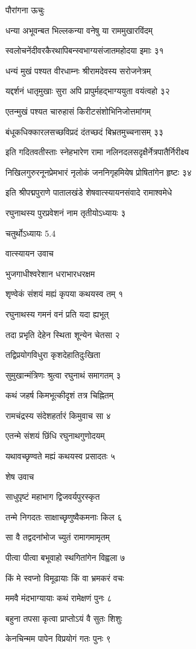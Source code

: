 पौरांगना ऊचुः

धन्या अभूवन्बत भिल्लकन्या वनेषु या राममुखारविंदम्

स्वलोचनेंदीवरकैरथापिबन्स्वभाग्यसंजातमहोदया इमाः ३१

धन्यं मुखं पश्यत वीरधाम्नः श्रीरामदेवस्य सरोजनेत्रम्

यद्दर्शनं धातृमुखाः सुरा अपि प्रापुर्महद्भाग्ययुता वयंत्वहो ३२

एतन्मुखं पश्यत चारुहासं किरीटसंशोभिनिजोत्तमांगम्

बंधूकधिक्कारलसच्छविप्रदं दंतच्छदं बिभ्रतमुच्चनासम् ३३

इति गदितवतीस्ताः स्नेहभारेण रामा नलिनदलसदृक्षैर्नेत्रपातैर्निरीक्ष्य

निखिलगुरुरनूनप्रेमभारं नृलोकं जननिगृहमियेष प्रोषितांगेन हृष्टः ३४

इति श्रीपद्मपुराणे पातालखंडे शेषवात्स्यायनसंवादे रामाश्वमेधे

रघुनाथस्य पुरप्रवेशनं नाम तृतीयोऽध्यायः ३

चतुर्थोऽध्यायः 5.4

वात्स्यायन उवाच

भुजगाधीश्वरेशान धराभारधरक्षम

शृण्वेकं संशयं मह्यं कृपया कथयस्व तम् १

रघुनाथस्य गमनं वनं प्रति यदा ह्यभूत्

तदा प्रभृति देहेन स्थिता शून्येन चेतसा २

तद्विप्रयोगविधुरा कृशदेहातिदुःखिता

सुमुखान्मंत्रिणः श्रुत्वा रघुनाथं समागतम् ३

कथं जहर्ष किमभूत्कीदृशं तत्र चिह्नितम्

रामचंद्रस्य संदेशहर्तारं किमुवाच सा ४

एतन्मे संशयं छिंधि रघुनाथगुणोदयम्

यथावच्छृण्वते मह्यं कथयस्व प्रसादतः ५

शेष उवाच

साधुपृष्टं महाभाग द्विजवर्यपुरस्कृत

तन्मे निगदतः साक्षाच्छृणुष्वैकमनाः किल ६

सा वै तद्वदनांभोज च्युतं रामागमामृतम्

पीत्वा पीत्वा बभूवाहो स्थगितांगेन विह्वला ७

किं मे स्वप्नो विमूढायाः किं वा भ्रमकरं वचः

ममवै मंदभाग्यायाः कथं रामेक्षणं पुनः ८

बहुना तपसा कृत्वा प्राप्तोऽयं वै सुतः शिशुः

केनचिन्मम पापेन विप्रयोगं गतः पुनः ९

